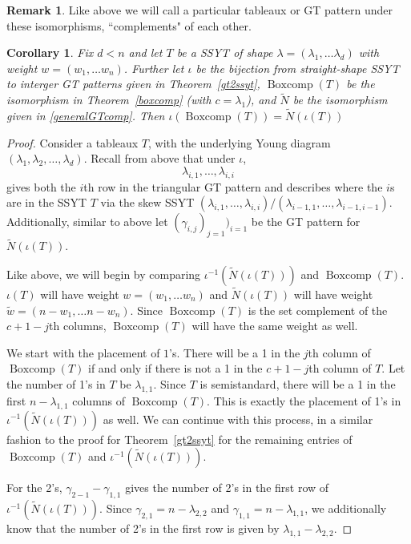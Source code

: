 \documentclass[10pt]{article}
\theoremstyle{plain}
\newtheorem{corollary}[thm]{Corollary}
\theoremstyle{definition}
\newtheorem{remark}[thm]{Remark}
\newcommand{\bc}{\operatorname{Boxcomp}}
\begin{document}
\begin{remark}
Like above we will call a particular tableaux or GT pattern under these isomorphisms, ``complements" of each other. 
\end{remark}

\begin{corollary} Fix $d<n$ and let $T$ be a SSYT of shape $\lambda = (\lambda_1, \dots \lambda_d)$ with weight $w = (w_1, \dots w_n)$. Further let $\iota$ be the bijection from straight-shape SSYT to interger GT patterns given in Theorem~\ref{gt2ssyt}, $\bc(T)$ be the isomorphism in Theorem~\ref{boxcomp} (with $c=\lambda_1$), and $\tilde{N}$ be the isomorphism given in \ref{generalGTcomp}. Then $\iota(\bc(T)) = \tilde{N}(\iota(T))$
\end{corollary}

\begin{proof}
Consider a tableaux $T$, with the underlying Young diagram $(\lambda_1, \lambda_2, \dots, \lambda_d)$. Recall from above that under $\iota$, 
\[
\lambda_{i,1}, \dots, \lambda_{i,i}
\]
gives both the $i$th row in the triangular GT pattern and describes where the $i$s are in the SSYT $T$ via the skew SSYT $(\lambda_{i,1}, \dots, \lambda_{i,i})/(\lambda_{i-1,1}, \dots, \lambda_{i-1,i-1})$. Additionally, similar to above let $(\gamma_{i,j})_{j=1})_{i=1}$ be the GT pattern for $\tilde{N}(\iota(T))$.

Like above, we will begin by comparing $\iota^{-1}(\tilde{N}(\iota(T)))$ and $\bc(T)$. $\iota(T)$ will have weight $w = (w_1, \dots w_n)$ and $\tilde{N}(\iota(T))$ will have 
weight $\tilde{w} = (n-w_1, \dots n-w_n)$. Since $\bc(T)$ is the set complement of the $c+1-j$th columns, $\bc(T)$ will have the same weight as well. 

We start with the placement of $1$'s. There will be a 1 in the $j$th column of $\bc(T)$ if and only if there is not a 1 in the $c+1-j$th column of $T$. Let the number of 1's in $T$ be $\lambda_{1,1}$. Since $T$ is semistandard, there will be a 1 in the first $n-\lambda_{1,1}$ columns of $\bc(T)$. This is exactly the placement of 1's in $\iota^{-1}(\tilde{N}(\iota(T)))$ as well. We can continue with this process, in a similar fashion to the proof for Theorem~\ref{gt2ssyt} for the remaining entries of $\bc(T)$ and $\iota^{-1}(\tilde{N}(\iota(T)))$. 

For the 2's, $\gamma_{2-1}- \gamma_{1,1}$ gives the number of 2's in the first row of $\iota^{-1}(\tilde{N}(\iota(T)))$. Since $\gamma_{2,1} = n - \lambda_{2,2}$ and $\gamma_{1,1} = n - \lambda_{1,1}$, we additionally know that the number of 2's in the first row is given by $\lambda_{1,1}- \lambda_{2,2}$. 


\end{proof}
\end{document}
